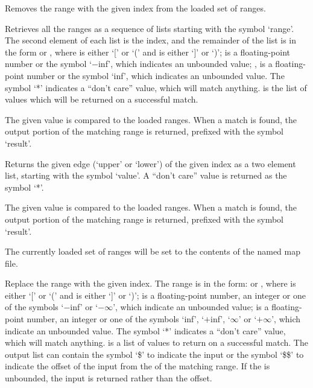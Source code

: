   Removes the range with the given index from the loaded set of ranges.

  Retrieves all the ranges as a sequence of lists starting with the symbol `range'.
  The second element of each list is the index, and the remainder of the list is in the form
   or , where 
  is either `[' or `(' and  is either `]' or `)';
   is a floating-point number or the symbol `$-$inf',
  which indicates an unbounded value; , is a floating-point number or
  the symbol `inf', which indicates an unbounded value.
  The symbol `*' indicates a ``don't care'' value, which will match anything.
   is the list of values which will be returned on a successful match.

  The given value is compared to the loaded ranges.
  When a match is found, the output portion of the matching range is returned, prefixed with the symbol
  `result'.
  
  Returns the given edge (`upper' or `lower') of the given index as a two element list,
  starting with the symbol `value'.
  A ``don't care'' value is returned as the symbol `*'.

  The given value is compared to the loaded ranges.
  When a match is found, the output portion of the matching range is returned, prefixed with the symbol
  `result'.
  
  The currently loaded set of ranges will be set to the contents of the named map file.
 
  Replace the range with the given index.
  The range is in the form:  or , where
   is either `[' or `(' and  is either `]' or `)';
   is a floating-point number, an integer or one of the symbols `$-$inf' or
  `$-\infty$', which indicate an unbounded value;
   is a floating-point number, an integer or one of the symbols
  `inf', `$+$inf', `$\infty$' or `$+\infty$', which indicate an unbounded value.
  The symbol `*' indicates a ``don't care'' value, which will match anything.
   is a list of values to return on a successful match.
  The output list can contain the symbol `\$' to indicate the input or the symbol `\$\$' to
  indicate the offset of the input from the  of the matching range.
  If the  is unbounded, the input is returned rather than the offset.

